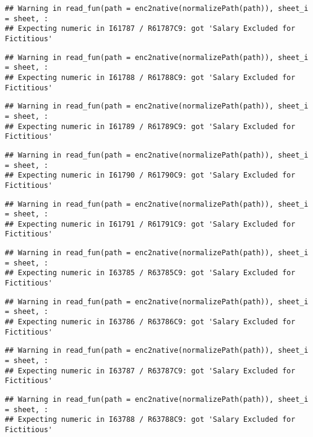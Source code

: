 \documentclass[
]{article}
\begin{document}
\begin{verbatim}
## Warning in read_fun(path = enc2native(normalizePath(path)), sheet_i = sheet, :
## Expecting numeric in I61787 / R61787C9: got 'Salary Excluded for Fictitious'
\end{verbatim}

\begin{verbatim}
## Warning in read_fun(path = enc2native(normalizePath(path)), sheet_i = sheet, :
## Expecting numeric in I61788 / R61788C9: got 'Salary Excluded for Fictitious'
\end{verbatim}

\begin{verbatim}
## Warning in read_fun(path = enc2native(normalizePath(path)), sheet_i = sheet, :
## Expecting numeric in I61789 / R61789C9: got 'Salary Excluded for Fictitious'
\end{verbatim}

\begin{verbatim}
## Warning in read_fun(path = enc2native(normalizePath(path)), sheet_i = sheet, :
## Expecting numeric in I61790 / R61790C9: got 'Salary Excluded for Fictitious'
\end{verbatim}

\begin{verbatim}
## Warning in read_fun(path = enc2native(normalizePath(path)), sheet_i = sheet, :
## Expecting numeric in I61791 / R61791C9: got 'Salary Excluded for Fictitious'
\end{verbatim}

\begin{verbatim}
## Warning in read_fun(path = enc2native(normalizePath(path)), sheet_i = sheet, :
## Expecting numeric in I63785 / R63785C9: got 'Salary Excluded for Fictitious'
\end{verbatim}

\begin{verbatim}
## Warning in read_fun(path = enc2native(normalizePath(path)), sheet_i = sheet, :
## Expecting numeric in I63786 / R63786C9: got 'Salary Excluded for Fictitious'
\end{verbatim}

\begin{verbatim}
## Warning in read_fun(path = enc2native(normalizePath(path)), sheet_i = sheet, :
## Expecting numeric in I63787 / R63787C9: got 'Salary Excluded for Fictitious'
\end{verbatim}

\begin{verbatim}
## Warning in read_fun(path = enc2native(normalizePath(path)), sheet_i = sheet, :
## Expecting numeric in I63788 / R63788C9: got 'Salary Excluded for Fictitious'
\end{verbatim}
\end{document}
